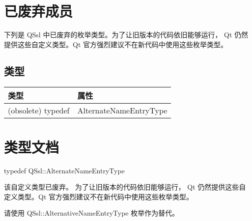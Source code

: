 \section{已废弃成员}

下列是 QSsl 中已废弃的枚举类型。为了让旧版本的代码依旧能够运行， Qt 仍然提供这些自定义类型。Qt 官方强烈建议不在新代码中使用这些枚举类型。

\subsection{类型}

\begin{tabular}[l]{|l|l|}
\hline
类型 &	属性 \\ 
\hline
(obsolete) typedef &	AlternateNameEntryType \\ 
\hline
\end{tabular}

\section{类型文档}

typedef QSsl::AlternateNameEntryType

该自定义类型已废弃。
为了让旧版本的代码依旧能够运行， Qt 仍然提供这些自定义类型。Qt 官方强烈建议不在新代码中使用这些枚举类型。

请使用 QSsl::AlternativeNameEntryType 枚举作为替代。
